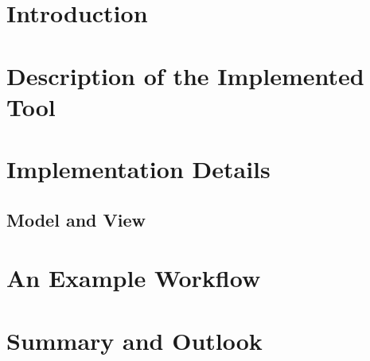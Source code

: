 \documentclass{itetemplate_en-gb}
\begin{document}
\chapter{Introduction}

	
	
	
	
\chapter{Description of the Implemented Tool}

	
	

\chapter{Implementation Details}
	\label{sec-chapter-implementation}
	
	
	
		
	
	
	\section{Model and View}
		\label{sec-model-view}
		
		
		
		
		
	
\chapter{An Example Workflow}

	

\chapter{Summary and Outlook}	

	
	

	\renewcommand{\bibname}{References}
	
	

	\appendix
	
\end{document}
